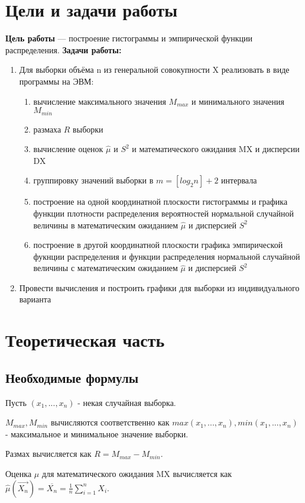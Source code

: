 \chapter{Цели и задачи работы}
\textbf{Цель работы} --- построение гистограммы и эмпирической функции распределения.
\textbf{Задачи работы:}
\begin{enumerate}
\item Для выборки объёма n из генеральной совокупности X реализовать в виде программы на ЭВМ:
\begin{enumerate}
\item вычисление максимального значения $M_{max}$ и минимального значения $M_{min}$
\item размаха $R$ выборки
\item вычисление оценок $\hat{\mu}$ и $S^{2}$ и математического ожидания MX и дисперсии DX
\item группировку значений выборки в $m = [log_{2} n] + 2$ интервала
\item построение на одной координатной плоскости гистограммы и графика функции плотности распределения вероятностей нормальной случайной величины в математическим ожиданием $\hat{\mu}$ и дисперсией $S^{2}$
\item построение в другой координатной плоскости графика эмпирической фукнции распределения и функции распределения нормальной случайной величины с математическим ожиданием $\hat{\mu}$ и дисперсией $S^{2}$
\end{enumerate}
\item Провести вычисления и построить графики для выборки из индивидуального варианта
\end{enumerate}

\chapter{Теоретическая часть}
\section{Необходимые формулы}
Пусть $(x_{1}, ..., x_{n})$ - некая случайная выборка.

$M_{max}, M_{min}$ вычисляются соответственно как $max(x_{1}, ..., x_{n}), min(x_{1}, ..., x_{n})$ - максимальное и минимальное значение выборки.

Размах вычисляется как $R = M_{max} - M_{min}$.

Оценка $\hat{\mu}$ для математического ожидания MX вычисляется как $\hat{\mu}(\overrightarrow{X_{n}}) = \overline{X_{n}} = \frac{1}{n}\sum\limits_{i=1}^{n} X_{i}$.

